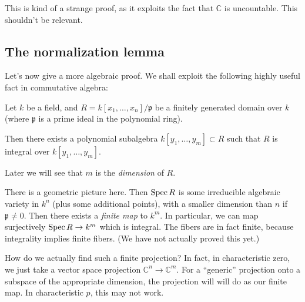 This is kind of a strange proof, as it exploits the fact that $\mathbb{C}$ is
uncountable.
This shouldn't be relevant.

\subsection{The normalization lemma}

Let's now give a more algebraic proof.
We shall exploit the following highly useful fact in commutative algebra:

\begin{theorem} Let $k$ be a field, and $R =
k[x_1, \dots, x_n]/\mathfrak{p}$ be a finitely generated domain over $k$ (where
$\mathfrak{p}$ is a prime ideal in the polynomial ring).

Then there exists a polynomial subalgebra $k[y_1, \dots, y_m] \subset R$ such
that $R$ is integral over $k[y_1, \dots, y_m]$.
\end{theorem}

Later we will see that $m$ is the \emph{dimension} of $R$.

There is a geometric picture here. Then $\operatorname{Spec} R$ is some irreducible algebraic
variety in $k^n$ (plus some additional points), with a smaller dimension than
$n$ if $\mathfrak{p} \neq 0$. Then there exists a \emph{finite map} to $k^m$.
In particular, we can map surjectively $\operatorname{Spec} R \to k^m$ which is integral.
The fibers are in fact finite, because integrality implies finite fibers.  (We
have not actually proved this yet.)

How do we actually find such a finite projection? In fact, in characteristic
zero, we just take a
vector space projection $\mathbb{C}^n \to \mathbb{C}^m$. For a ``generic''
projection onto a subspace of the appropriate dimension, the projection will
will do as our finite map. In characteristic $p$, this may not work.

